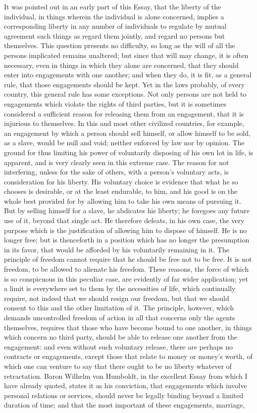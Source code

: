 \documentclass[12pt]{report}
\begin{document}
It was pointed out in an early part of this Essay, that the liberty of the individual, in things wherein the individual is alone concerned, implies a corresponding liberty in any number of individuals to regulate by mutual agreement such things as regard them jointly, and regard no persons but themselves. This question presents no difficulty, so long as the will of all the persons implicated remains unaltered; but since that will may change, it is often necessary, even in things in which they alone are concerned, that they should enter into engagements with one another; and when they do, it is fit, as a general rule, that those engagements should be kept. Yet in the laws probably, of every country, this general rule has some exceptions. Not only persons are not held to engagements which violate the rights of third parties, but it is sometimes considered a sufficient reason for releasing them from an engagement, that it is injurious to themselves. In this and most other civilized countries, for example, an engagement by which a person should sell himself, or allow himself to be sold, as a slave, would be null and void; neither enforced by law nor by opinion. The ground for thus limiting his power of voluntarily disposing of his own lot in life, is apparent, and is very clearly seen in this extreme case. The reason for not interfering, unless for the sake of others, with a person's voluntary acts, is consideration for his liberty. His voluntary choice is evidence that what he so chooses is desirable, or at the least endurable, to him, and his good is on the whole best provided for by allowing him to take his own means of pursuing it. But by selling himself for a slave, he abdicates his liberty; he foregoes any future use of it, beyond that single act. He therefore defeats, in his own case, the very purpose which is the justification of allowing him to dispose of himself. He is no longer free; but is thenceforth in a position which has no longer the presumption in its favor, that would be afforded by his voluntarily remaining in it. The principle of freedom cannot require that he should be free not to be free. It is not freedom, to be allowed to alienate his freedom. These reasons, the force of which is so conspicuous in this peculiar case, are evidently of far wider application; yet a limit is everywhere set to them by the necessities of life, which continually require, not indeed that we should resign our freedom, but that we should consent to this and the other limitation of it. The principle, however, which demands uncontrolled freedom of action in all that concerns only the agents themselves, requires that those who have become bound to one another, in things which concern no third party, should be able to release one another from the engagement: and even without such voluntary release, there are perhaps no contracts or engagements, except those that relate to money or money's worth, of which one can venture to say that there ought to be no liberty whatever of retractation. Baron Wilhelm von Humboldt, in the excellent Essay from which I have already quoted, states it as his conviction, that engagements which involve personal relations or services, should never be legally binding beyond a limited duration of time; and that the most important of these engagements, marriage, 
\end{document}
